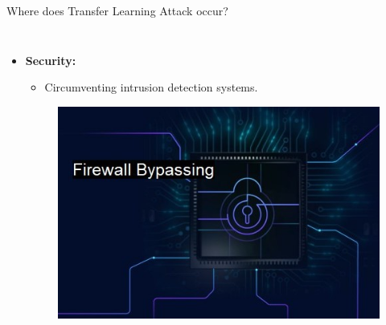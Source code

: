 \begin{frame}{Where does Transfer Learning Attack occur?}
\begin{columns}
        \begin{itemize}
            \item \textbf{\large Security:}
            \begin{itemize}
                \item Circumventing intrusion detection systems.
            \end{itemize}
            \begin{figure}
                \centering
                \includegraphics[width=0.7\linewidth]{img/firewall bypassing.png}
            \end{figure}
        \end{itemize}
    \end{columns}
\end{frame}

